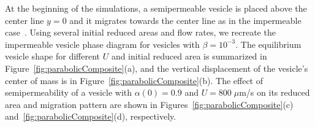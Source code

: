 \documentclass[prb,preprint,showpacs,preprintnumbers,amsmath,amssymb,longbibliography]{revtex4-1}
\begin{document}
%
%
%
%
%
%

At the beginning of the simulations, a semipermeable vesicle is placed
above the center line $y=0$ and it migrates towards the center line as
in the impermeable case~\cite{dan-vla-mis2009}. 
%
%
%
Using several initial reduced areas and flow rates, we recreate the
impermeable vesicle phase diagram for vesicles with $\beta = 10^{-3}$.
The equilibrium vesicle shape for different $U$ and initial reduced area
is summarized in Figure~\ref{fig:parabolicComposite}(a), and the
vertical displacement of the vesicle's center of mass is in
Figure~\ref{fig:parabolicComposite}(b). The effect of semipermeability
of a vesicle with $\alpha(0) = 0.9$ and $U=800\; \mu$m/s on its reduced
area and migration pattern are shown in
Figures~\ref{fig:parabolicComposite}(c)
and~\ref{fig:parabolicComposite}(d), respectively. 
\end{document}
